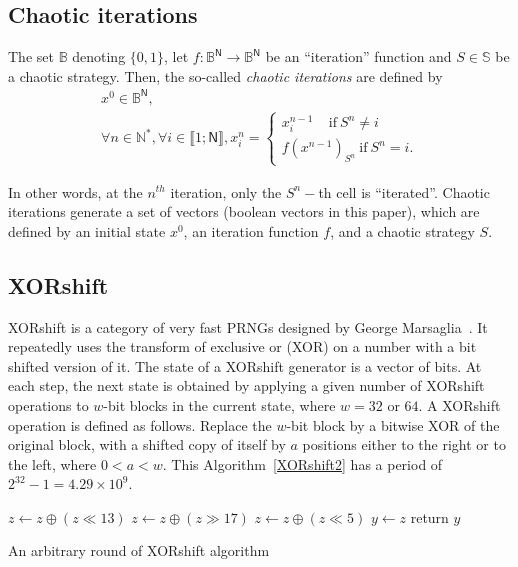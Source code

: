 \documentclass[10pt, a4paper, conference, compsocconf]{IEEEtran}
\begin{document}
\subsection{Chaotic iterations}
\label{subsection:Chaotic iterations}
\begin{definition}
The set $\mathds{B}$ denoting $\{0,1\}$, let $f:\mathds{B}^{\mathsf{N}}\longrightarrow \mathds{B}^{\mathsf{N}}$ be an ``iteration'' function and $S\in \mathbb{S}
$ be a chaotic strategy. Then, the so-called \emph{chaotic iterations} are defined by~\cite{Robert1986}
\begin{equation}
\begin{array}{l}
x^0\in \mathds{B}^{\mathsf{N}}, \\
\forall n\in \mathds{N}^{\ast },\forall i\in \llbracket1;\mathsf{N}\rrbracket ,x_i^n=\left\{
\begin{array}{l}
x_i^{n-1}~~~~~\text{if}~S^n\neq i \\
f(x^{n-1})_{S^n}~\text{if}~S^n=i.\end{array} \right. \end{array}
\end{equation}
\end{definition}
In other words, at the $n^{th}$ iteration, only the $S^{n}-$th cell is
\textquotedblleft iterated\textquotedblright.
Chaotic iterations generate a set of vectors (boolean vectors in this paper),
which are defined by an initial state $x^{0}$, an iteration function $f$, and a
chaotic strategy $S$.

\subsection{XORshift}
\label{XORshift}
XORshift is a category of very fast PRNGs designed by George Marsaglia~\cite{Marsaglia2003}.
It repeatedly uses the transform of exclusive or (XOR) on a number with a bit shifted version of it. The state of a XORshift generator is a vector of bits. At each step, the next state is obtained by applying a given number of XORshift operations to $w$-bit blocks in the current state, where $w = 32$ or $64$. A XORshift operation is defined as follows. Replace the $w$-bit block by a bitwise XOR of the original block, with a shifted copy of itself by $a$ positions either to the right or to the left, where $ 0 < a < w$. This Algorithm~\ref{XORshift2} has a period of $2^{32}-1=4.29\times10^9$.

\begin{algorithm}
\SetAlgoLined
{}
$z\leftarrow{z\oplus{(z\ll13)}}$\;
$z\leftarrow{z\oplus{(z\gg17)}}$\;
$z\leftarrow{z\oplus{(z\ll5)}}$\;
$y\leftarrow{z}$\;
return $y$\;
\medskip
\caption{An arbitrary round of XORshift algorithm}
\label{XORshift2}
\end{algorithm}
\end{document}
